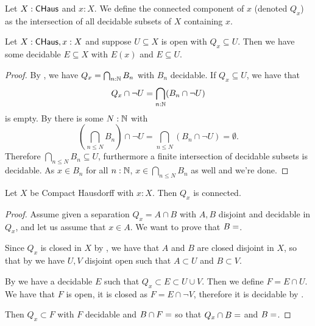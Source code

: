 \begin{definition}
  Let $X:\mathsf{CHaus}$ and $x:X$. 
  We define the connected component of $x$ (denoted $Q_x$)
  as the intersection of all decidable subsets of $X$ containing $x$. 
\end{definition}

\begin{lemma}\label{ConnectedComponentSubOpenHasDecidableInbetween}
  Let $X:\mathsf{CHaus}, x:X$ and suppose $U\subseteq X$ is open with $Q_x\subseteq U$. 
  Then we have some decidable $E\subseteq X$ with $E(x)$ and $E\subseteq U$. 
\end{lemma}
\begin{proof}
  By , we have $Q_x = \bigcap_{n:\mathbb{N}}B_n$ with $B_n$ decidable. 
  If $Q_x \subseteq U$, we have that 
  $$Q_x\cap \neg U = \bigcap_{n:\mathbb{N}} (B_n \cap \neg U)$$ is empty. 
  By  there is some $N:\mathbb{N}$ with 
  $$(\bigcap_{n\leq N} B_n )\cap \neg U  = \bigcap_{n\leq N} (B_n \cap \neg U) = \emptyset.$$
  Therefore $\bigcap_{n\leq N} B_n \subseteq U$, furthermore a finite intersection of decidable subsets is decidable. 
  As $x\in B_n$ for all $n:\mathbb{N}$, $x\in \bigcap_{n\leq N} B_n$ as well and we're done. 
\end{proof}

\begin{lemma}\label{ConnectedComponentConnected}
Let $X$ be Compact Hausdorff with $x:X$. Then $Q_x$ is connected.
\end{lemma}
\begin{proof}
Assume given a separation $Q_x = A\cap B$ with $A,B$ disjoint and decidable in $Q_x$, and let us assume that $x\in A$. We want to prove that $B=\empty$. 

Since $Q_x$ is closed in $X$ by , we have that $A$ and $B$ are closed disjoint in $X$, so that by  we have $U,V$ disjoint open such that $A\subset U$ and $B\subset V$. 

By  we have a decidable $E$ such that $Q_x\subset E\subset U\cup V$. Then we define $F = E\cap U$. We have that $F$ is open, it is closed as $F=E\cap \neg V$, therefore it is decidable by .

Then $Q_x\subset F$ with $F$ decidable and $B\cap F = \empty$ so that $Q_x\cap B = \empty$ and $B=\empty$.
\end{proof}

